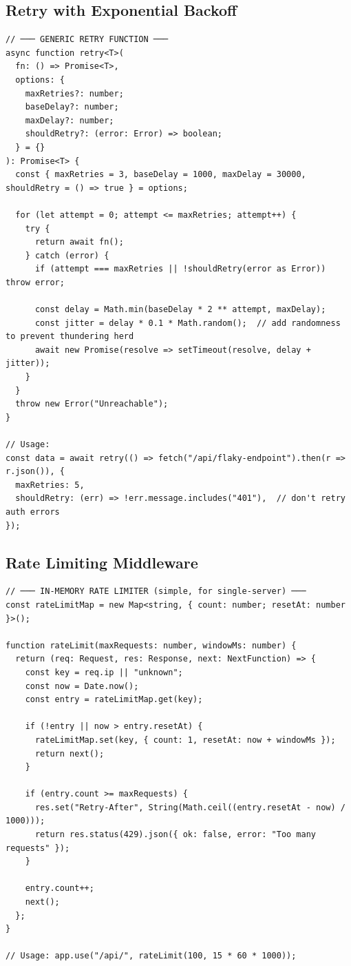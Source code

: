 \documentclass[10pt, a4paper]{article}
\begin{document}
\subsection{Retry with Exponential Backoff}


\begin{lstlisting}[language=myjs]
// ─── GENERIC RETRY FUNCTION ───
async function retry<T>(
  fn: () => Promise<T>,
  options: {
    maxRetries?: number;
    baseDelay?: number;
    maxDelay?: number;
    shouldRetry?: (error: Error) => boolean;
  } = {}
): Promise<T> {
  const { maxRetries = 3, baseDelay = 1000, maxDelay = 30000, shouldRetry = () => true } = options;

  for (let attempt = 0; attempt <= maxRetries; attempt++) {
    try {
      return await fn();
    } catch (error) {
      if (attempt === maxRetries || !shouldRetry(error as Error)) throw error;

      const delay = Math.min(baseDelay * 2 ** attempt, maxDelay);
      const jitter = delay * 0.1 * Math.random();  // add randomness to prevent thundering herd
      await new Promise(resolve => setTimeout(resolve, delay + jitter));
    }
  }
  throw new Error("Unreachable");
}

// Usage:
const data = await retry(() => fetch("/api/flaky-endpoint").then(r => r.json()), {
  maxRetries: 5,
  shouldRetry: (err) => !err.message.includes("401"),  // don't retry auth errors
});
\end{lstlisting}


\subsection{Rate Limiting Middleware}


\begin{lstlisting}[language=myjs]
// ─── IN-MEMORY RATE LIMITER (simple, for single-server) ───
const rateLimitMap = new Map<string, { count: number; resetAt: number }>();

function rateLimit(maxRequests: number, windowMs: number) {
  return (req: Request, res: Response, next: NextFunction) => {
    const key = req.ip || "unknown";
    const now = Date.now();
    const entry = rateLimitMap.get(key);

    if (!entry || now > entry.resetAt) {
      rateLimitMap.set(key, { count: 1, resetAt: now + windowMs });
      return next();
    }

    if (entry.count >= maxRequests) {
      res.set("Retry-After", String(Math.ceil((entry.resetAt - now) / 1000)));
      return res.status(429).json({ ok: false, error: "Too many requests" });
    }

    entry.count++;
    next();
  };
}

// Usage: app.use("/api/", rateLimit(100, 15 * 60 * 1000));
\end{lstlisting}
\end{document}
